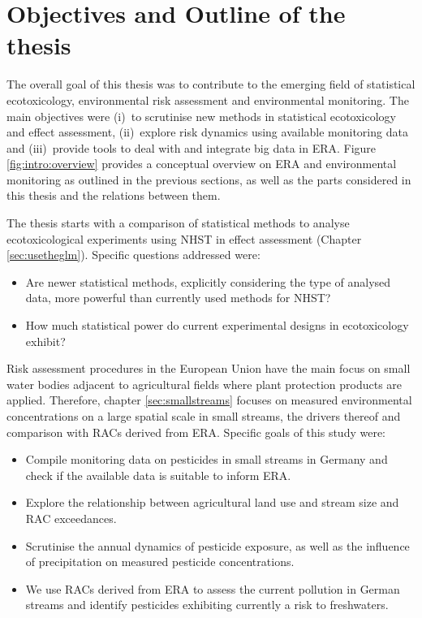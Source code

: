 \section{Objectives and Outline of the thesis}

The overall goal of this thesis was to contribute to the emerging field of statistical ecotoxicology, environmental risk assessment and environmental monitoring.
The main objectives were (i)~to scrutinise new methods in statistical ecotoxicology and effect assessment,
(ii)~explore risk dynamics using available monitoring data and
(iii)~provide tools to deal with and integrate big data in ERA.
Figure \ref{fig:intro:overview} provides a conceptual overview on ERA and environmental monitoring as outlined in the previous sections, as well as the parts considered in this thesis and the relations between them. 

\noindent The thesis starts with a comparison of statistical methods to analyse ecotoxicological experiments using NHST in effect assessment (Chapter \ref{sec:usetheglm}). 
Specific questions addressed were:

\begin{itemize}
	\item Are newer statistical methods, explicitly considering the type of analysed data, more powerful than currently used methods for NHST?
	\item How much statistical power do current experimental designs in ecotoxicology exhibit?
\end{itemize}


\noindent Risk assessment procedures in the European Union have the main focus on small water bodies adjacent to agricultural fields where plant protection products are applied.
Therefore, chapter \ref{sec:smallstreams} focuses on measured environmental concentrations on a large spatial scale in small streams, the drivers thereof and comparison with RACs derived from ERA.
Specific goals of this study were:
\begin{itemize}
	\item Compile monitoring data on pesticides in small streams in Germany and check if the available data is suitable to inform ERA.
	\item Explore the relationship between agricultural land use and stream size and RAC exceedances.
	\item Scrutinise the annual dynamics of pesticide exposure, as well as the influence of precipitation on measured pesticide concentrations.
	\item We use RACs derived from ERA to assess the current pollution in German streams and identify pesticides exhibiting currently a risk to freshwaters.
\end{itemize}

